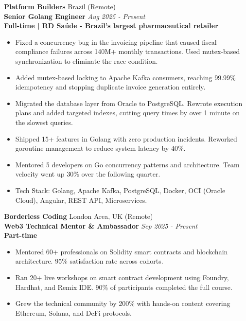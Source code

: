 \documentclass[10pt,a4paper]{article}
\newcommand{\experienceheader}[4]{
    \textbf{\color{subtitlecolor}#1} \hfill #2\\
    \textbf{#3} \hfill \textit{#4}\\
}
\begin{document}
\vspace{2pt}
\experienceheader{Platform Builders}{Brazil (Remote)}{Senior Golang Engineer}{Aug 2025 - Present}
\textbf{\footnotesize Full-time | RD Sa\'{u}de - Brazil's largest pharmaceutical retailer}
\begin{itemize}
    \item {\footnotesize Fixed a concurrency bug in the invoicing pipeline that caused fiscal compliance failures across 140M+ monthly transactions. Used mutex-based synchronization to eliminate the race condition.}
    \item {\footnotesize Added mutex-based locking to Apache Kafka consumers, reaching 99.99\% idempotency and stopping duplicate invoice generation entirely.}
    \item {\footnotesize Migrated the database layer from Oracle to PostgreSQL. Rewrote execution plans and added targeted indexes, cutting query times by over 1 minute on the slowest queries.}
    \item {\footnotesize Shipped 15+ features in Golang with zero production incidents. Reworked goroutine management to reduce system latency by 40\%.}
    \item {\footnotesize Mentored 5 developers on Go concurrency patterns and architecture. Team velocity went up 30\% over the following quarter.}
    \item {\footnotesize Tech Stack: Golang, Apache Kafka, PostgreSQL, Docker, OCI (Oracle Cloud), Angular, REST API, Microservices.}
\end{itemize}

\vspace{2pt}
\experienceheader{Borderless Coding}{London Area, UK (Remote)}{Web3 Technical Mentor \& Ambassador}{Sep 2025 - Present}
\textbf{\footnotesize Part-time}
\begin{itemize}
    \item {\footnotesize Mentored 60+ professionals on Solidity smart contracts and blockchain architecture. 95\% satisfaction rate across cohorts.}
    \item {\footnotesize Ran 20+ live workshops on smart contract development using Foundry, Hardhat, and Remix IDE. 90\% of participants completed the full course.}
    \item {\footnotesize Grew the technical community by 200\% with hands-on content covering Ethereum, Solana, and DeFi protocols.}
\end{itemize}
\end{document}
